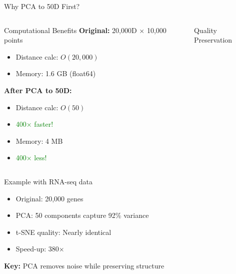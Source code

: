 \documentclass[aspectratio=169]{beamer}
\begin{document}
\begin{frame}{Why PCA to 50D First?}

\begin{columns}
\begin{block}{Computational Benefits}
\textbf{Original:} 20,000D × 10,000 points
\begin{itemize}
    \item Distance calc: $O(20,000)$
    \item Memory: 1.6 GB (float64)
\end{itemize}

\textbf{After PCA to 50D:}
\begin{itemize}
    \item Distance calc: $O(50)$
    \item \textcolor{green}{400× faster!}
    \item Memory: 4 MB
    \item \textcolor{green}{400× less!}
\end{itemize}
\end{block}

\begin{block}{Quality Preservation}
\end{block}
\end{columns}

\vspace{0.3cm}
\begin{exampleblock}{Example with RNA-seq data}
\begin{itemize}
    \item Original: 20,000 genes
    \item PCA: 50 components capture 92\% variance
    \item t-SNE quality: Nearly identical
    \item Speed-up: 380×
\end{itemize}
\end{exampleblock}

\centering
\textbf{Key:} PCA removes noise while preserving structure

\end{frame}
\end{document}
